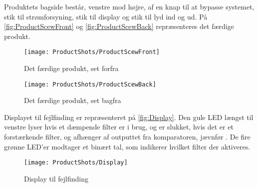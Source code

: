 \noindent
Produktets bagside består, venstre mod højre, af en knap til at bypasse systemet, stik til strømforsyning, stik til display og stik til lyd ind og ud.
%
\newpage
\noindent
%
På \autoref{fig:ProductScewFront} og \autoref{fig:ProductScewBack} repræsenteres det færdige produkt.
\begin{figure}[H]
	\centering
	\texttt{[image: ProductShots/ProductScewFront]}
	\caption{Det færdige produkt, set forfra}
	\label{fig:ProductScewFront}
\end{figure}
%
\noindent
\begin{figure}[H]
	\centering
	\texttt{[image: ProductShots/ProductScewBack]}
	\caption{Det færdige produkt, set bagfra}
	\label{fig:ProductScewBack}
\end{figure}
\noindent
%
\newpage
\noindent
%
Displayet til fejlfinding er repræsenteret på \autoref{fig:Display}. Den gule LED længst til venstre lyser hvis et dæmpende filter er i brug, og er slukket, hvis det er et forstærkende filter, og afhænger af outputtet fra komparatoren, jævnfør . De fire grønne LED'er modtager et binært tal, som indikerer hvilket filter der aktiveres.
\begin{figure}[H]
	\centering
	\texttt{[image: ProductShots/Display]}
	\caption{Display til fejlfinding}
	\label{fig:Display}
\end{figure}
\noindent